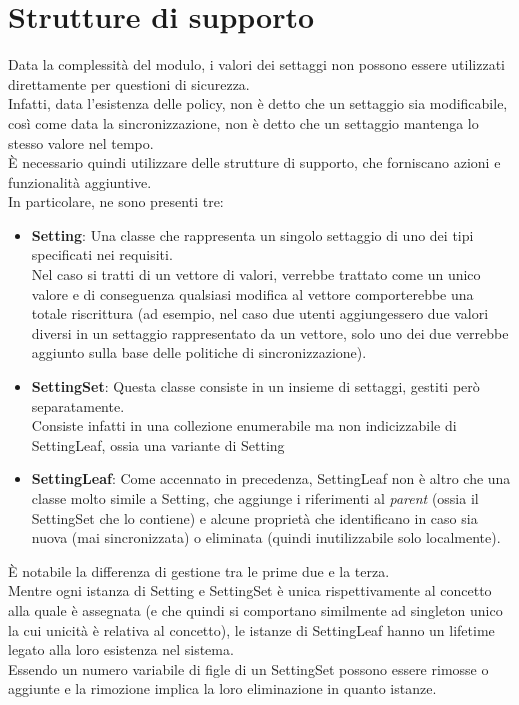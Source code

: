 \documentclass[\main/tesi.tex]{subfiles}
\begin{document}
\section{Strutture di supporto}
\label{strutturesupporto}
Data la complessità del modulo, i valori dei settaggi non possono essere utilizzati direttamente per questioni di sicurezza.\\
Infatti, data l'esistenza delle policy, non è detto che un settaggio sia modificabile, così come data la sincronizzazione, non è detto che un settaggio mantenga lo stesso valore nel tempo.\\
È necessario quindi utilizzare delle strutture di supporto, che forniscano azioni e funzionalità aggiuntive.\\
In particolare, ne sono presenti tre:
\begin{itemize}
    \item \textbf{Setting}: Una classe che rappresenta un singolo settaggio di uno dei tipi specificati nei requisiti.\\Nel caso si tratti di un vettore di valori, verrebbe trattato come un unico valore e di conseguenza qualsiasi modifica al vettore comporterebbe una totale riscrittura (ad esempio, nel caso due utenti aggiungessero due valori diversi in un settaggio rappresentato da un vettore, solo uno dei due verrebbe aggiunto sulla base delle politiche di sincronizzazione).
    \item \textbf{SettingSet}: Questa classe consiste in un insieme di settaggi, gestiti però separatamente.\\Consiste infatti in una collezione enumerabile ma non indicizzabile di SettingLeaf, ossia una variante di Setting
    \item \textbf{SettingLeaf}: Come accennato in precedenza, SettingLeaf non è altro che una classe molto simile a Setting, che aggiunge i riferimenti al \textit{parent} (ossia il SettingSet che lo contiene) e alcune proprietà che identificano in caso sia nuova (mai sincronizzata) o eliminata (quindi inutilizzabile solo localmente).
\end{itemize}
È notabile la differenza di gestione tra le prime due e la terza.\\
Mentre ogni istanza di Setting e SettingSet è unica rispettivamente al concetto alla quale è assegnata (e che quindi si comportano similmente ad singleton unico la cui unicità è relativa al concetto), le istanze di SettingLeaf hanno un lifetime legato alla loro esistenza nel sistema.\\
Essendo un numero variabile di figle di un SettingSet possono essere rimosse o aggiunte e la rimozione implica la loro eliminazione in quanto istanze.\\
\end{document}
